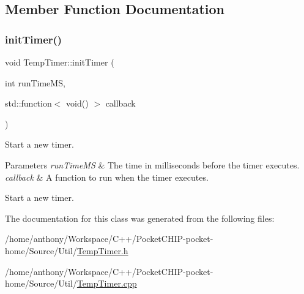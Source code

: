 \subsection{Member Function Documentation}
\mbox{\label{classTempTimer_a5db68af0dbd4edf0d9c66ff5286d72a4}} 
\subsubsection{\texorpdfstring{init\+Timer()}{initTimer()}}
{\footnotesize\ttfamily void Temp\+Timer\+::init\+Timer (\begin{DoxyParamCaption}\item[{int}]{run\+Time\+MS,  }\item[{std\+::function$<$ void() $>$}]{callback }\end{DoxyParamCaption})\hspace{0.3cm}{\ttfamily [static]}}

Start a new timer.


\begin{DoxyParams}{Parameters}
{\em run\+Time\+MS} & The time in milliseconds before the timer executes.\\
\hline
{\em callback} & A function to run when the timer executes.\\
\hline
\end{DoxyParams}
Start a new timer. 

The documentation for this class was generated from the following files\+:\begin{DoxyCompactItemize}
\item 
/home/anthony/\+Workspace/\+C++/\+Pocket\+C\+H\+I\+P-\/pocket-\/home/\+Source/\+Util/\mbox{\hyperlink{TempTimer_8h}{Temp\+Timer.\+h}}\item 
/home/anthony/\+Workspace/\+C++/\+Pocket\+C\+H\+I\+P-\/pocket-\/home/\+Source/\+Util/\mbox{\hyperlink{TempTimer_8cpp}{Temp\+Timer.\+cpp}}\end{DoxyCompactItemize}
